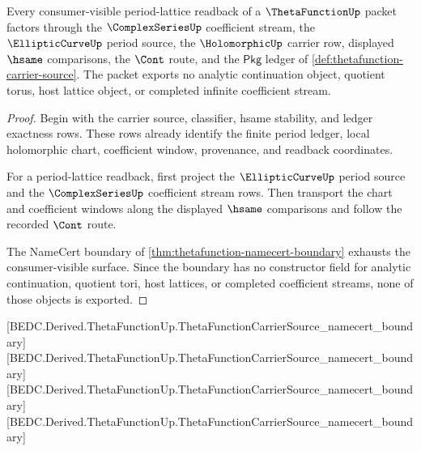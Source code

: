 \begin{theorem}
\label{thm:thetafunction-period-lattice-scope}
Every consumer-visible period-lattice readback of a $\ThetaFunctionUp$ packet factors through the $\ComplexSeriesUp$ coefficient stream, the $\EllipticCurveUp$ period source, the $\HolomorphicUp$ carrier row, displayed $\hsame$ comparisons, the $\Cont$ route, and the $\mathsf{Pkg}$ ledger of \autoref{def:thetafunction-carrier-source}. The packet exports no analytic continuation object, quotient torus, host lattice object, or completed infinite coefficient stream.
\end{theorem}
\begin{proof}
Begin with the carrier source, classifier, hsame stability, and ledger exactness rows. These rows already identify the finite period ledger, local holomorphic chart, coefficient window, provenance, and readback coordinates.

For a period-lattice readback, first project the $\EllipticCurveUp$ period source and the $\ComplexSeriesUp$ coefficient stream rows. Then transport the chart and coefficient windows along the displayed $\hsame$ comparisons and follow the recorded $\Cont$ route.

The NameCert boundary of \autoref{thm:thetafunction-namecert-boundary} exhausts the consumer-visible surface. Since the boundary has no constructor field for analytic continuation, quotient tori, host lattices, or completed coefficient streams, none of those objects is exported.
\end{proof}

[BEDC.Derived.ThetaFunctionUp.ThetaFunctionCarrierSource\_namecert\_boundary]
[BEDC.Derived.ThetaFunctionUp.ThetaFunctionCarrierSource\_namecert\_boundary]
[BEDC.Derived.ThetaFunctionUp.ThetaFunctionCarrierSource\_namecert\_boundary]
[BEDC.Derived.ThetaFunctionUp.ThetaFunctionCarrierSource\_namecert\_boundary]

\begin{closurestatus}{\ThetaFunctionUp}
  \theoryclosure{\publicClosure}
  \formalstatus{\axiomCleanV}
\end{closurestatus}

